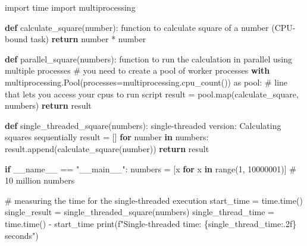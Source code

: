 \documentclass[
  letterpaper,
  DIV=11,
  numbers=noendperiod]{scrartcl}
\newenvironment{Shaded}{\begin{snugshade}}{\end{snugshade}}
\newcommand{\BuiltInTok}[1]{\textcolor[rgb]{0.00,0.23,0.31}{#1}}
\newcommand{\CommentTok}[1]{\textcolor[rgb]{0.37,0.37,0.37}{#1}}
\newcommand{\ControlFlowTok}[1]{\textcolor[rgb]{0.00,0.23,0.31}{\textbf{#1}}}
\newcommand{\DecValTok}[1]{\textcolor[rgb]{0.68,0.00,0.00}{#1}}
\newcommand{\ImportTok}[1]{\textcolor[rgb]{0.00,0.46,0.62}{#1}}
\newcommand{\KeywordTok}[1]{\textcolor[rgb]{0.00,0.23,0.31}{\textbf{#1}}}
\newcommand{\NormalTok}[1]{\textcolor[rgb]{0.00,0.23,0.31}{#1}}
\newcommand{\OperatorTok}[1]{\textcolor[rgb]{0.37,0.37,0.37}{#1}}
\newcommand{\SpecialCharTok}[1]{\textcolor[rgb]{0.37,0.37,0.37}{#1}}
\newcommand{\SpecialStringTok}[1]{\textcolor[rgb]{0.13,0.47,0.30}{#1}}
\newcommand{\StringTok}[1]{\textcolor[rgb]{0.13,0.47,0.30}{#1}}
\newcommand{\VariableTok}[1]{\textcolor[rgb]{0.07,0.07,0.07}{#1}}
\begin{document}
\begin{Shaded}
\begin{Highlighting}[]
\ImportTok{import}\NormalTok{ time}
\ImportTok{import}\NormalTok{ multiprocessing}


\KeywordTok{def}\NormalTok{ calculate\_square(number):}
    \CommentTok{\textquotesingle{}\textquotesingle{}\textquotesingle{}}
\CommentTok{    function to calculate square of a number (CPU{-}bound task)}
\CommentTok{    \textquotesingle{}\textquotesingle{}\textquotesingle{}}
    \ControlFlowTok{return}\NormalTok{ number }\OperatorTok{*}\NormalTok{ number}


\KeywordTok{def}\NormalTok{ parallel\_square(numbers):}
    \CommentTok{\textquotesingle{}\textquotesingle{}\textquotesingle{}}
\CommentTok{    function to run the calculation in parallel using multiple processes}
\CommentTok{    \textquotesingle{}\textquotesingle{}\textquotesingle{}}
    \CommentTok{\# you need to create a pool of worker processes}
    \ControlFlowTok{with}\NormalTok{ multiprocessing.Pool(processes}\OperatorTok{=}\NormalTok{multiprocessing.cpu\_count()) }\ImportTok{as}\NormalTok{ pool: }\CommentTok{\# line that lets you access your cpus to run script}
\NormalTok{        result }\OperatorTok{=}\NormalTok{ pool.}\BuiltInTok{map}\NormalTok{(calculate\_square, numbers)}
    \ControlFlowTok{return}\NormalTok{ result}

\KeywordTok{def}\NormalTok{ single\_threaded\_square(numbers):}
    \CommentTok{\textquotesingle{}\textquotesingle{}\textquotesingle{}}
\CommentTok{    single{-}threaded version: Calculating squares sequentially}
\CommentTok{    \textquotesingle{}\textquotesingle{}\textquotesingle{}}
\NormalTok{    result }\OperatorTok{=}\NormalTok{ []}
    \ControlFlowTok{for}\NormalTok{ number }\KeywordTok{in}\NormalTok{ numbers:}
\NormalTok{        result.append(calculate\_square(number))}
    \ControlFlowTok{return}\NormalTok{ result}

\ControlFlowTok{if} \VariableTok{\_\_name\_\_} \OperatorTok{==} \StringTok{"\_\_main\_\_"}\NormalTok{:}
\NormalTok{    numbers }\OperatorTok{=}\NormalTok{ [x }\ControlFlowTok{for}\NormalTok{ x }\KeywordTok{in} \BuiltInTok{range}\NormalTok{(}\DecValTok{1}\NormalTok{, }\DecValTok{10000001}\NormalTok{)]  }\CommentTok{\# 10 million numbers}
    
    \CommentTok{\# measuring the time for the single{-}threaded execution}
\NormalTok{    start\_time }\OperatorTok{=}\NormalTok{ time.time()}
\NormalTok{    single\_result }\OperatorTok{=}\NormalTok{ single\_threaded\_square(numbers)}
\NormalTok{    single\_thread\_time }\OperatorTok{=}\NormalTok{ time.time() }\OperatorTok{{-}}\NormalTok{ start\_time}
    \BuiltInTok{print}\NormalTok{(}\SpecialStringTok{f"Single{-}threaded time: }\SpecialCharTok{\{}\NormalTok{single\_thread\_time}\SpecialCharTok{:.2f\}}\SpecialStringTok{ seconds"}\NormalTok{)}
    

\end{Highlighting}
\end{Shaded}
\end{document}
